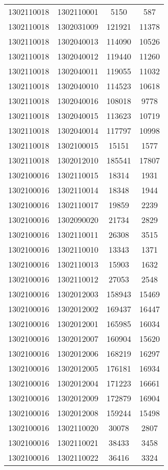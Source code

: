 \begin{longtable}[h]{llcc}
		1302110018 & 1302110001 & 5150 & 587\\
		1302110018 & 1302031009 & 121921 & 11378\\
		1302110018 & 1302040013 & 114090 & 10526\\
		1302110018 & 1302040012 & 119440 & 11260\\
		1302110018 & 1302040011 & 119055 & 11032\\
		1302110018 & 1302040010 & 114523 & 10618\\
		1302110018 & 1302040016 & 108018 & 9778\\
		1302110018 & 1302040015 & 113623 & 10719\\
		1302110018 & 1302040014 & 117797 & 10998\\
		1302110018 & 1302100015 & 15151 & 1577\\
		1302110018 & 1302012010 & 185541 & 17807\\
		1302100016 & 1302110015 & 18314 & 1931\\
		1302100016 & 1302110014 & 18348 & 1944\\
		1302100016 & 1302110017 & 19859 & 2239\\
		1302100016 & 1302090020 & 21734 & 2829\\
		1302100016 & 1302110011 & 26308 & 3515\\
		1302100016 & 1302110010 & 13343 & 1371\\
		1302100016 & 1302110013 & 15903 & 1632\\
		1302100016 & 1302110012 & 27053 & 2548\\
		1302100016 & 1302012003 & 158943 & 15469\\
		1302100016 & 1302012002 & 169437 & 16447\\
		1302100016 & 1302012001 & 165985 & 16034\\
		1302100016 & 1302012007 & 160904 & 15620\\
		1302100016 & 1302012006 & 168219 & 16297\\
		1302100016 & 1302012005 & 176181 & 16934\\
		1302100016 & 1302012004 & 171223 & 16661\\
		1302100016 & 1302012009 & 172879 & 16904\\
		1302100016 & 1302012008 & 159244 & 15498\\
		1302100016 & 1302110020 & 30078 & 2807\\
		1302100016 & 1302110021 & 38433 & 3458\\
		1302100016 & 1302110022 & 36416 & 3324\\

\end{longtable}
